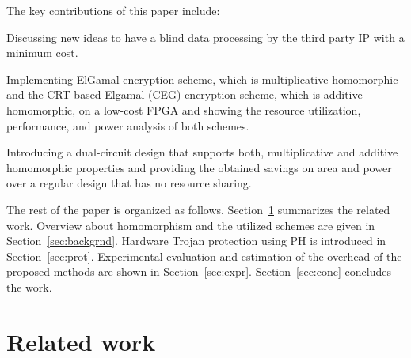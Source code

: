 \documentclass[conference]{IEEEtran}
\begin{document}
The key contributions of this paper include: 
\begin{compactenum}
\item Discussing new ideas to have a blind data processing by the third party IP with a minimum cost.
\item Implementing ElGamal encryption scheme, which is multiplicative homomorphic and the CRT-based Elgamal (CEG) encryption scheme, which is additive homomorphic, on a low-cost FPGA and showing the resource utilization, performance, and power analysis of both schemes.
\item Introducing a dual-circuit design that supports both, multiplicative and additive homomorphic properties and providing the obtained savings on area and power over a regular design that has no resource sharing. 
\end{compactenum}

The rest of the paper is organized as follows. Section~\ref{sec:relwrk} summarizes the related work. Overview about homomorphism and the utilized schemes are given in Section~\ref{sec:backgrnd}. Hardware Trojan protection using PH is introduced in Section~\ref{sec:prot}. Experimental evaluation and estimation of the overhead of the proposed methods are shown in Section~\ref{sec:expr}. Section~\ref{sec:conc} concludes the work.

\section{Related work} \label{sec:relwrk}
\end{document}
